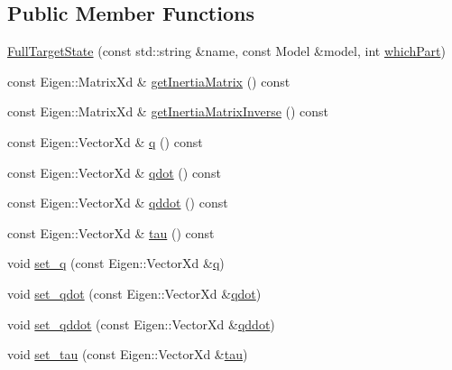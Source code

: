 \subsection*{Public Member Functions}
\begin{DoxyCompactItemize}
\item 
\hyperlink{classocra_1_1FullTargetState_a8164de6021f986fb82022b2fed1e0402}{Full\+Target\+State} (const std\+::string \&name, const Model \&model, int \hyperlink{classocra_1_1FullState_a75ec7c039df8cb8608ebf34f7b779be5}{which\+Part})
\item 
const Eigen\+::\+Matrix\+Xd \& \hyperlink{classocra_1_1FullTargetState_ad7a1b06462ba3cc348e5634e1a0db0b2}{get\+Inertia\+Matrix} () const
\item 
const Eigen\+::\+Matrix\+Xd \& \hyperlink{classocra_1_1FullTargetState_a55194b2f5683696eeee538cb93f3403a}{get\+Inertia\+Matrix\+Inverse} () const
\item 
const Eigen\+::\+Vector\+Xd \& \hyperlink{classocra_1_1FullTargetState_a0f246232828d53c497924b95d2b97004}{q} () const
\item 
const Eigen\+::\+Vector\+Xd \& \hyperlink{classocra_1_1FullTargetState_a2ada581270803a39e8c690f8c9354644}{qdot} () const
\item 
const Eigen\+::\+Vector\+Xd \& \hyperlink{classocra_1_1FullTargetState_a1436b42b01d2857e4dc5c53a233f0e69}{qddot} () const
\item 
const Eigen\+::\+Vector\+Xd \& \hyperlink{classocra_1_1FullTargetState_a56855f5d42e84f456a89fd259c4b7edb}{tau} () const
\item 
void \hyperlink{classocra_1_1FullTargetState_a902f4f9662d53b930073cab837ab7835}{set\+\_\+q} (const Eigen\+::\+Vector\+Xd \&\hyperlink{classocra_1_1FullTargetState_a0f246232828d53c497924b95d2b97004}{q})
\item 
void \hyperlink{classocra_1_1FullTargetState_afdaa12a27a353e3aca61212fa1313c5b}{set\+\_\+qdot} (const Eigen\+::\+Vector\+Xd \&\hyperlink{classocra_1_1FullTargetState_a2ada581270803a39e8c690f8c9354644}{qdot})
\item 
void \hyperlink{classocra_1_1FullTargetState_a462f462af7480759f251cc2087c747e7}{set\+\_\+qddot} (const Eigen\+::\+Vector\+Xd \&\hyperlink{classocra_1_1FullTargetState_a1436b42b01d2857e4dc5c53a233f0e69}{qddot})
\item 
void \hyperlink{classocra_1_1FullTargetState_a351cd0cf06d81362558128b0d8d4149a}{set\+\_\+tau} (const Eigen\+::\+Vector\+Xd \&\hyperlink{classocra_1_1FullTargetState_a56855f5d42e84f456a89fd259c4b7edb}{tau})
\end{DoxyCompactItemize}
